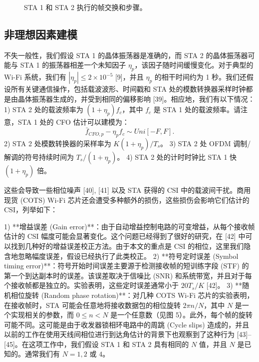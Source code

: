 \documentclass[journal]{IEEEtran}
\begin{document}
\begin{figure}[htbp]
\centering
{}
\caption{STA 1 和 STA 2 执行的帧交换和步骤。}
\label{fig:fig4}
\end{figure}

\subsection{非理想因素建模}
不失一般性，我们假设 STA 1 的晶体振荡器是准确的，而 STA 2 的晶体振荡器可能与 STA 1 的振荡器相差一个未知因子 $\eta_p$，该因子随时间缓慢变化。对于典型的 Wi-Fi 系统，我们有 $|\eta_p| \le 2 \times 10^{-5}$ [9]，并且 $\eta_p$ 的相干时间约为 1 秒。我们还假设所有关键通信操作，包括载波波形、时间戳和 STA 处的模数转换器采样时钟都是由晶体振荡器生成的，并受到相同的偏移影响 [39]。相应地，我们有以下情况：
1) STA 2 处的载波频率为 $(1+\eta_p)f_c$，其中 $f_c$ 是 STA 1 处的载波频率。请注意，STA 1 处的 CFO 估计可以建模为：
\begin{equation}
\bar{f}_{CFO,p} - \eta_p f_c \sim Uni[-F, F]. \label{eq:1}
\end{equation}
2) STA 2 处模数转换器的采样率为 $K(1+\eta_p)/T_s$。
3) STA 2 处 OFDM 调制/解调的符号持续时间为 $T_s/(1+\eta_p)$。
4) STA 2 处的计时时钟比 STA 1 快 $(1+\eta_p)$ 倍。

这些会导致一些相位噪声 [40], [41] 以及 STA 获得的 CSI 中的载波间干扰。商用现货 (COTS) Wi-Fi 芯片还会遭受多种额外的损伤，这些损伤会影响它们估计的 CSI，列举如下：

1) **增益误差 (Gain error)**：由于自动增益控制电路的可变增益，从每个接收帧估计的 CSI 幅度可能会显著变化。这个问题已经得到了很好的研究，在 [42] 中可以找到几种好的增益误差校正方法。由于本文的重点是 CSI 的相位，这里我们隐含地忽略幅度误差，假设已经执行了此类校正。
2) **符号定时误差 (Symbol timing error)**：符号开始时间误差主要源于检测接收帧的短训练字段 (STF) 的第一个到达副本时的误差。该误差取决于信噪比 (SNR) 和系统带宽，并且对于每个接收帧都是独立的。实验表明，这些定时误差通常小于 $20 T_s/K$ [42]。
3) **随机相位旋转 (Random phase rotation)**：对几种 COTS Wi-Fi 芯片的实验表明，在接收帧时，STA 可能会任意地将接收数据包的相位旋转 $2\pi n/N$，其中 $N$ 是一个实现相关的参数，而 $0 \le n < N$ 是一个任意数（见图 5）。此外，每个帧的旋转可能不同。这可能是由于收发器锁相环电路中的周跳 (Cycle slips) 造成的，并且以前的工作在使用天线间相位进行到达角估计的背景下也观察到了这种行为 [43]–[45]。在这项工作中，我们假设 STA 1 和 STA 2 具有相同的 $N$ 值，并且 $N$ 是已知的。通常我们有 $N=1, 2$ 或 $4$。
\end{document}
